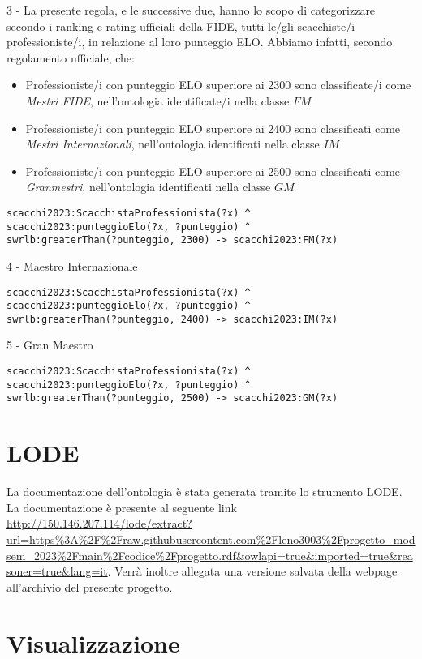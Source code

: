 \documentclass[12pt]{book}
\begin{document}
3 - La presente regola, e le successive due, hanno lo scopo di
categorizzare secondo i ranking e rating ufficiali della FIDE, tutti
le/gli scacchiste/i professioniste/i, in relazione al loro punteggio ELO.
Abbiamo infatti, secondo regolamento ufficiale, che:
\begin{itemize}
  \item Professioniste/i con punteggio ELO superiore ai 2300 sono
    classificate/i come \textit{Mestri FIDE}, nell'ontologia
    identificate/i nella classe $FM$
  \item Professioniste/i con punteggio ELO superiore ai 2400 sono
    classificati come \textit{Mestri Internazionali}, nell'ontologia
    identificati nella classe $IM$
  \item Professioniste/i con punteggio ELO superiore ai 2500 sono
    classificati come \textit{Granmestri}, nell'ontologia
    identificati nella classe $GM$
\end{itemize}

\begin{verbatim}
scacchi2023:ScacchistaProfessionista(?x) ^
scacchi2023:punteggioElo(?x, ?punteggio) ^
swrlb:greaterThan(?punteggio, 2300) -> scacchi2023:FM(?x)
\end{verbatim}

4 - Maestro Internazionale

\begin{verbatim}
scacchi2023:ScacchistaProfessionista(?x) ^
scacchi2023:punteggioElo(?x, ?punteggio) ^
swrlb:greaterThan(?punteggio, 2400) -> scacchi2023:IM(?x)
\end{verbatim}

5 - Gran Maestro

\begin{verbatim}
scacchi2023:ScacchistaProfessionista(?x) ^
scacchi2023:punteggioElo(?x, ?punteggio) ^
swrlb:greaterThan(?punteggio, 2500) -> scacchi2023:GM(?x)
\end{verbatim}


\chapter{LODE}

La documentazione dell'ontologia è stata generata tramite lo strumento
LODE. La documentazione è presente al seguente link \url{http://150.146.207.114/lode/extract?url=https%3A%2F%2Fraw.githubusercontent.com%2Fleno3003%2Fprogetto_modsem_2023%2Fmain%2Fcodice%2Fprogetto.rdf&owlapi=true&imported=true&reasoner=true&lang=it}.
Verrà inoltre allegata una versione salvata della webpage
all'archivio del presente progetto.

\chapter{Visualizzazione}
\end{document}

